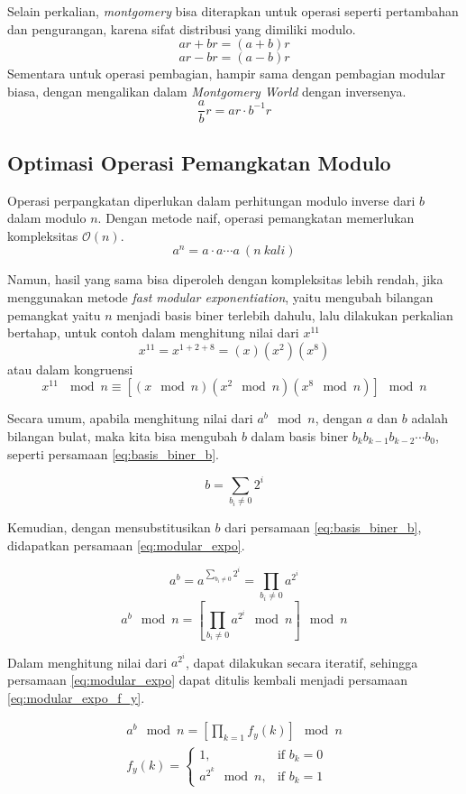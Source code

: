 Selain perkalian, \textit{montgomery} bisa diterapkan untuk operasi seperti pertambahan dan pengurangan, karena sifat distribusi yang dimiliki modulo.
$$ ar + br = (a+b)r $$
$$ ar - br = (a-b)r $$
Sementara untuk operasi pembagian, hampir sama dengan pembagian modular biasa, dengan mengalikan dalam \textit{Montgomery World} dengan inversenya.
$$ \frac{a}{b}r = ar \cdot b^{-1}r $$

\subsection{Optimasi Operasi Pemangkatan Modulo}
Operasi perpangkatan diperlukan dalam perhitungan modulo inverse dari $ b $ dalam modulo $ n $. Dengan metode naif, operasi pemangkatan memerlukan kompleksitas $ \mathcal{O}{(n)} $.
$$ a^n = a \cdot a \cdots a\ (n\ kali) $$

Namun, hasil yang sama bisa diperoleh dengan kompleksitas lebih rendah, jika menggunakan metode \textit{fast modular exponentiation}, yaitu mengubah bilangan pemangkat yaitu $ n $ menjadi basis biner terlebih dahulu, lalu dilakukan perkalian bertahap, untuk contoh dalam menghitung nilai dari $ x^{11} $
$$ x^{11} = x^{1+2+8} = (x)(x^{2})(x^{8}) $$
atau dalam kongruensi 
$$ x^{11}\ \mod{n} \equiv [(x\mod{n})(x^{2}\mod{n})(x^{8}\mod{n})]\mod{n} $$

Secara umum, apabila menghitung nilai dari $ a^b\mod{n} $, dengan $ a $ dan $ b $ adalah bilangan bulat, maka kita bisa mengubah $ b $ dalam basis biner $b_{k} b_{k-1} b_{k-2} \cdots b_{0}$, seperti persamaan \eqref{eq:basis_biner_b}.

\begin{equation}
	b = \sum_{b_i \neq 0} 2^i
	\label{eq:basis_biner_b}
\end{equation}

Kemudian, dengan mensubstitusikan $ b $ dari persamaan \eqref{eq:basis_biner_b}, didapatkan persamaan \eqref{eq:modular_expo}.

$$ a^b = a^{\sum_{b_i \neq 0} 2^i} = \prod_{b_i \neq 0} a^{2^{i}} $$
\begin{equation}
	a^b\mod{n} = \left [ \prod_{b_i \neq 0} a^{2^{i}} \mod{n} \right ] \mod{n}
	\label{eq:modular_expo}
\end{equation}

Dalam menghitung nilai dari $ a^{2^{i}} $, dapat dilakukan secara iteratif, sehingga persamaan \eqref{eq:modular_expo} dapat ditulis kembali menjadi persamaan \eqref{eq:modular_expo_f_y}.

\begin{equation}
	\begin{aligned}
	a^b\mod{n} = \left [ \prod_{k = 1} f_y(k)\right ] \mod{n} \\
	f_y(k)=
		\begin{cases}
			1,  					& \text{if } b_k=0 \\
			a^{2^{k}}  \mod{n} ,   & \text{if } b_k=1
		\end{cases} \\
	\end{aligned}
	\label{eq:modular_expo_f_y}
\end{equation}

